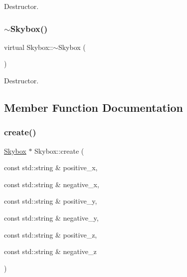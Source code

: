Destructor. \mbox{\label{classSkybox_a75809f0396413e4e74a348291fcd99f9}} 
\subsubsection{\texorpdfstring{$\sim$\+Skybox()}{~Skybox()}\hspace{0.1cm}{\footnotesize\ttfamily [2/2]}}
{\footnotesize\ttfamily virtual Skybox\+::$\sim$\+Skybox (\begin{DoxyParamCaption}{ }\end{DoxyParamCaption})\hspace{0.3cm}{\ttfamily [virtual]}}

Destructor. 

\subsection{Member Function Documentation}
\mbox{\label{classSkybox_a9c53389b720093b09fc2b76dc6cf3185}} 
\subsubsection{\texorpdfstring{create()}{create()}\hspace{0.1cm}{\footnotesize\ttfamily [1/2]}}
{\footnotesize\ttfamily \hyperlink{classSkybox}{Skybox} $\ast$ Skybox\+::create (\begin{DoxyParamCaption}\item[{const std\+::string \&}]{positive\+\_\+x,  }\item[{const std\+::string \&}]{negative\+\_\+x,  }\item[{const std\+::string \&}]{positive\+\_\+y,  }\item[{const std\+::string \&}]{negative\+\_\+y,  }\item[{const std\+::string \&}]{positive\+\_\+z,  }\item[{const std\+::string \&}]{negative\+\_\+z }\end{DoxyParamCaption})\hspace{0.3cm}{\ttfamily [static]}}

